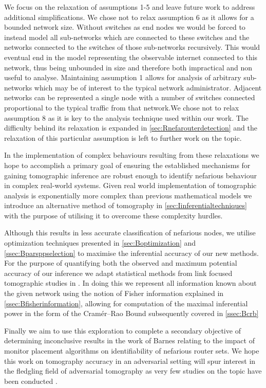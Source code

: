 We focus on the relaxation of assumptions 1-5 and leave future work to address additional simplifications. We chose not to relax assumption 6 as it allows for a bounded network size. Without switches as end nodes we would be forced to instead model all sub-networks which are connected to these switches and the networks connected to the switches of those sub-networks recursively. This would eventual end in the model representing the observable internet connected to this network, thus being unbounded in size and therefore both impractical and non useful to analyse. Maintaining assumption 1 allows for analysis of arbitrary sub-networks which may be of interest to the typical network administrator. Adjacent networks can be represented a single node with a number of switches connected proportional to the typical traffic from that network.We chose not to relax assumption 8 as it is key to the analysis technique used within our work. The difficulty behind its relaxation is expanded in \cref{sec:Rnefarouterdetection} and the relaxation of this particular assumption is left to further work on the topic.\par
In the implementation of complex behaviours resulting from these relaxations we hope to accomplish a primary goal of ensuring the established mechanisms for gaining tomographic inference are robust enough to identify nefarious behaviour in complex real-world systems. Given real world implementation of tomographic analysis is exponentially more complex than previous mathematical models we introduce an alternative method of \pdv tomography in \cref{sec:Iinferentialtechniques} with the purpose of utilising it to overcome these complexity hurdles.\par
Although this results in less accurate classification of nefarious nodes, we utilise optimization techniques presented in \cref{sec:Boptimization} and \cref{ssec:Bparsppselection} to maximise the inferential accuracy of our new methods. For the purpose of quantifying both the observed and maximum potential accuracy of our inference we adapt statistical methods from link focused tomographic studies in \cite{he_fisher_2015}. In doing this we represent all information known about the given network using the notion of Fisher information explained in \cref{ssec:Bfisherinformation}, allowing for computation of the maximal inferential power in the form of the Cramér–Rao Bound subsequently covered in \cref{ssec:Bcrb}\par
Finally we aim to use this exploration to complete a secondary objective of determining inconclusive results in the work of Barnes relating to the impact of monitor placement algorithms on identifiability of nefarious router sets. We hope this work on tomography accuracy in an adversarial setting will spur interest in the fledgling field of adversarial tomography as very few studies on the topic have been conducted \cite{he_network_2021}.

